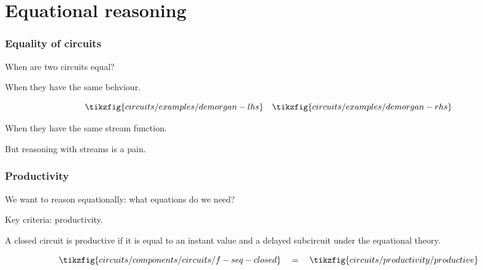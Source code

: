 \section{Equational reasoning}

\begin{frame}
    \frametitle{Equality of circuits}

    When are two circuits equal?

    \wait

    When they have the same \alert{behviour}.

    \wait

    \[
        \tikzfig{circuits/examples/demorgan-lhs} 
        \quad
        \tikzfig{circuits/examples/demorgan-rhs} 
    \]

    \wait

    When they have the same \alert{stream function}.

    \wait

    But reasoning with streams is a \alert{pain}.
    
\end{frame}

\begin{frame}
    \frametitle{Productivity}

    We want to reason \alert{equationally}: what equations do we need?

    \wait

    Key criteria: \alert{productivity}.

    \wait

    A closed circuit is \alert{productive} if it is equal to an \alert{instant value} and a \alert{delayed subcircuit} under the equational theory.

    \[
        \tikzfig{circuits/components/circuits/f-seq-closed}
        \quad
        =
        \quad    
        \tikzfig{circuits/productivity/productive}
    \]

\end{frame}

